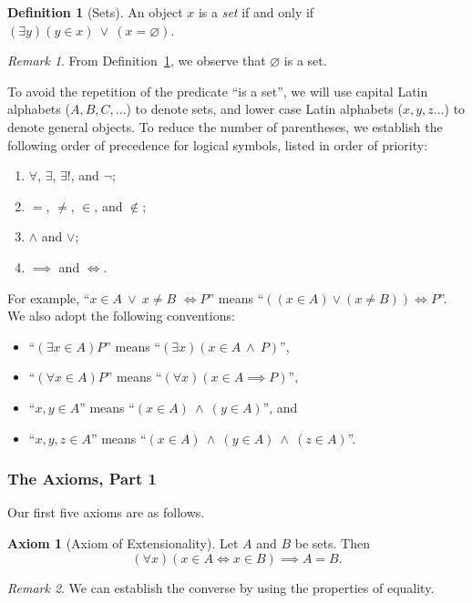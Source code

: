 \documentclass[a4paper,11pt]{article}
\theoremstyle{plain}
\theoremstyle{definition}
\newtheorem{defn}[thm]{Definition}
\newtheorem{axiom}{Axiom}
\theoremstyle{remark}
\newtheorem*{rem}{Remark}
\begin{document}
\begin{defn}[Sets]
\label{defn:set}
An object $x$ is a \textit{set} if and only if $(\exists y)(y \in x) \ \lor \ (x = \varnothing)$.
\end{defn}
\begin{rem}
From Definition~\ref{defn:set}, we observe that $\varnothing$ is a set. 
\end{rem}
To avoid the repetition of the predicate ``is a set'', we will use capital Latin alphabets ($A, B, C, \dots$) to denote sets, and lower case Latin alphabets ($x,y,z\dots$) to denote general objects. To reduce the number of parentheses, we establish the following order of precedence for logical symbols, listed in order of priority:
\begin{enumerate}
\item $\forall$, $\exists$, $\exists!$, and $\lnot$;
\item $=$, $\neq$, $\in$, and $\notin$;
\item $\land$ and $\lor$;
\item $\implies$ and $\iff$.
\end{enumerate}

\noindent For example, ``$x \in A \ \lor \ x \neq B$ $\iff P$'' means  ``$((x \in A) \lor (x \neq B)) \iff P$''. We also adopt the following conventions: 
\begin{itemize}
\item ``$(\exists x \in A) P$'' means ``$(\exists x)(x \in A \ \land \ P)$'', 
\item ``$(\forall x \in A) P$'' means ``$(\forall x)(x \in A \implies P)$'',
\item ``$x,y\in A$'' means ``$(x\in A)\ \land \ (y\in A)$'', and 
\item ``$x,y,z\in A$'' means ``$(x\in A)\ \land \ (y\in A) \ \land \ (z\in A)$''.
\end{itemize}

\subsubsection{The Axioms, Part 1}
\label{subsubsec:AxiomsPart1}
Our first five axioms are as follows.

\begin{axiom}[Axiom of Extensionality]
\label{axiom:extensionality}
Let $A$ and $B$ be sets. Then 
\[(\forall x)(x\in A \iff x\in B) \implies A = B.\]
\end{axiom}
\begin{rem}
We can establish the converse by using the properties of equality.
\end{rem}
\end{document}

